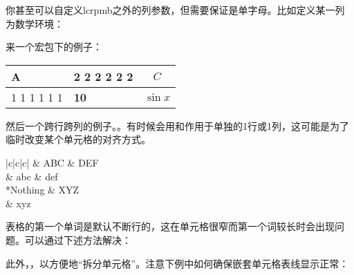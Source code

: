 你甚至可以自定义lcrpmb之外的列参数，但需要保证是单字母。比如定义某一列为数学环境：
\begin{latex}
\end{latex}

来一个宏包下的例子：
\begin{codeshow}
\begin{tabular}{|>{\setlength
  \parindent{5mm}}m{1cm}|
  >{\large\bfseries}m{1.5cm}|
  >{$}c<{$}|}
  \hline A & 2 2 2 2 2 2 & C\\
  \hline 1 1 1 1 1 1  & 10 & \sin x \\ \hline
\end{tabular}
\end{codeshow}

然后一个跨行跨列的例子。。有时候会用和作用于单独的1行或1列，这可能是为了临时改变某个单元格的对齐方式。

\begin{codeshow}
\begin{center}
\begin{tabular}{|c|c|c|}
  \hline
    & ABC & DEF \\
   & abc & def \\
  \hline
    {*{Nothing}} & XYZ \\
   & xyz \\
  \hline
\end{tabular}
\end{center}
\end{codeshow}

表格的第一个单词是默认不断行的，这在单元格很窄而第一个词较长时会出现问题。可以通过下述方法解决：


此外，，以方便地“拆分单元格”。注意下例中如何确保嵌套单元格表线显示正常：

